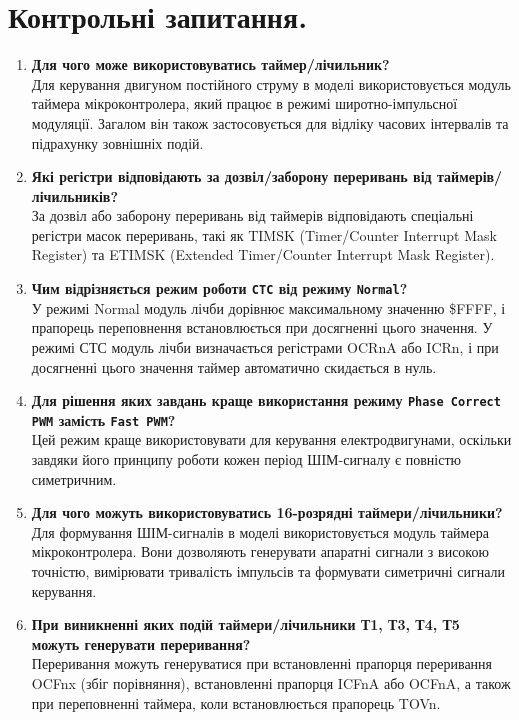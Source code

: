 \documentclass[14pt, a4paper]{extreport}
\begin{document}
	\section*{Контрольні запитання.}
	
	\begin{enumerate}
		\item \textbf{Для чого може використовуватись таймер/лічильник?} \\ Для керування двигуном постійного струму в моделі використовується модуль таймера мікроконтролера, який працює в режимі широтно-імпульсної модуляції. Загалом він також застосовується для відліку часових інтервалів та підрахунку зовнішніх подій.
		
		\item \textbf{Які регістри відповідають за дозвіл/заборону переривань від таймерів/лічильників?} \\ За дозвіл або заборону переривань від таймерів відповідають спеціальні регістри масок переривань, такі як TIMSK (Timer/Counter Interrupt Mask Register) та ETIMSK (Extended Timer/Counter Interrupt Mask Register).
		
		\item \textbf{Чим відрізняється режим роботи \texttt{СТС} від режиму \texttt{Normal}?} \\ У режимі Normal модуль лічби дорівнює максимальному значенню \$FFFF, і прапорець переповнення встановлюється при досягненні цього значення. У режимі СТС модуль лічби визначається регістрами OCRnA або ICRn, і при досягненні цього значення таймер автоматично скидається в нуль.
		
		\item \textbf{Для рішення яких завдань краще використання режиму \texttt{Phase Correct PWM} замість \texttt{Fast PWM}?} \\ Цей режим краще використовувати для керування електродвигунами, оскільки завдяки його принципу роботи кожен період ШІМ-сигналу є повністю симетричним.
		
		\item \textbf{Для чого можуть використовуватись 16-розрядні таймери/лічильники?} \\ Для формування ШІМ-сигналів в моделі використовується модуль таймера мікроконтролера. Вони дозволяють генерувати апаратні сигнали з високою точністю, вимірювати тривалість імпульсів та формувати симетричні сигнали керування.
		
		\item \textbf{При виникненні яких подій таймери/лічильники Т1, Т3, Т4, Т5 можуть генерувати переривання?} \\ Переривання можуть генеруватися при встановленні прапорця переривання OCFnx (збіг порівняння), встановленні прапорця ICFnA або OCFnA, а також при переповненні таймера, коли встановлюється прапорець TOVn.
		

\end{enumerate}
\end{document}
